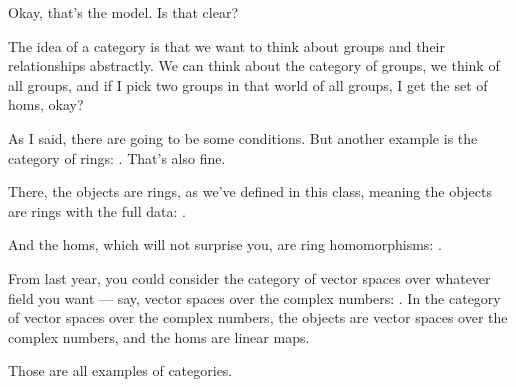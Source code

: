\begin{speech}[01:09:10 - 01:10:24]
Okay, that's the model. Is that clear?

The idea of a category is that we want to think about groups and their relationships abstractly. We can think about the category of groups, we think of all groups, and if I pick two groups in that world of all groups, I get the set of homs, okay?

As I said, there are going to be some conditions. But another example is the category of rings: . That's also fine.

There, the objects are rings, as we've defined in this class, meaning the objects are rings with the full data: .

And the homs, which will not surprise you, are ring homomorphisms: .

From last year, you could consider the category of vector spaces over whatever field you want --- say, vector spaces over the complex numbers: . In the category of vector spaces over the complex numbers, the objects are vector spaces over the complex numbers, and the homs are linear maps.

Those are all examples of categories.
\end{speech}

\begin{content}

\end{content}

